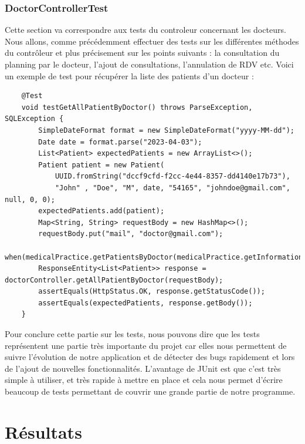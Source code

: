 \documentclass[a4paper]{report}
\begin{document}
\subsection{DoctorControllerTest}
Cette section va correspondre aux tests du controleur concernant les docteurs. Nous allons, comme précédemment effectuer des tests sur les différentes méthodes du contrôleur et plus précisement sur les points suivants :
la consultation du planning par le docteur, l'ajout de consultations, l'annulation de RDV etc.
Voici un exemple de test pour récupérer la liste des patients d'un docteur : \newline
\begin{lstlisting}
    @Test
    void testGetAllPatientByDoctor() throws ParseException, SQLException {
        SimpleDateFormat format = new SimpleDateFormat("yyyy-MM-dd");
        Date date = format.parse("2023-04-03");
        List<Patient> expectedPatients = new ArrayList<>();
        Patient patient = new Patient(
            UUID.fromString("dccf9cfd-f2cc-4e44-8357-dd4140e17b73"),
            "John" , "Doe", "M", date, "54165", "johndoe@gmail.com", null, 0, 0);
        expectedPatients.add(patient);
        Map<String, String> requestBody = new HashMap<>();
        requestBody.put("mail", "doctor@gmail.com");
        when(medicalPractice.getPatientsByDoctor(medicalPractice.getInformationsDoctorByMail("doctor@gmail.com"))).thenReturn(expectedPatients);
        ResponseEntity<List<Patient>> response = doctorController.getAllPatientByDoctor(requestBody);
        assertEquals(HttpStatus.OK, response.getStatusCode());
        assertEquals(expectedPatients, response.getBody()); 
    }
\end{lstlisting}

Pour conclure cette partie sur les tests, nous pouvons dire que les tests représentent une partie très importante du projet car elles nous permettent de suivre l'évolution de notre application
et de détecter des bugs rapidement et lors de l'ajout de nouvelles fonctionnalités. L'avantage de JUnit est que c'est très simple à utiliser, et très rapide à mettre en place et cela nous permet
d'écrire beaucoup de tests permettant de couvrir une grande partie de notre programme.


\chapter{Résultats}
\end{document}
